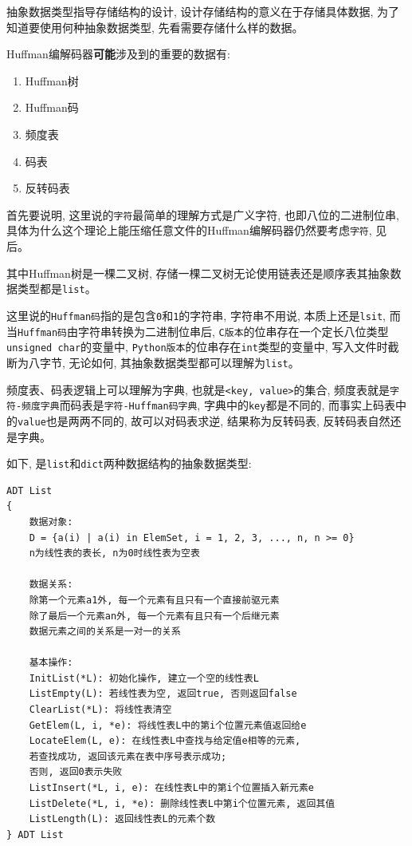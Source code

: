 \documentclass{ctexart}
\begin{document}
抽象数据类型指导存储结构的设计, 设计存储结构的意义在于存储具体数据, 为了知道要使用何种抽象数据类型, 先看需要存储什么样的数据。

Huffman编解码器\textbf{可能}涉及到的重要的数据有:

\begin{enumerate}
\def\labelenumi{\arabic{enumi}.}
\item
  Huffman树
\item
  Huffman码
\item
  频度表
\item
  码表
\item
  反转码表
\end{enumerate}

首先要说明, 这里说的\texttt{字符}最简单的理解方式是广义字符, 也即八位的二进制位串, 具体为什么这个理论上能压缩任意文件的Huffman编解码器仍然要考虑\texttt{字符}, 见后。

其中Huffman树是一棵二叉树, 存储一棵二叉树无论使用链表还是顺序表其抽象数据类型都是\texttt{list}。

这里说的\texttt{Huffman码}指的是包含\texttt{0}和\texttt{1}的字符串, 字符串不用说, 本质上还是\texttt{lsit},
而当\texttt{Huffman码}由字符串转换为二进制位串后, \texttt{C版本}的位串存在一个定长八位类型\texttt{unsigned\ char}的变量中, \texttt{Python版本}的位串存在\texttt{int}类型的变量中, 写入文件时截断为八字节, 无论如何, 其抽象数据类型都可以理解为\texttt{list}。

频度表、码表逻辑上可以理解为字典,
也就是\texttt{\textless{}key,\ value\textgreater{}}的集合, 频度表就是\texttt{字符-频度字典}而码表是\texttt{字符-Huffman码字典}, 字典中的\texttt{key}都是不同的, 而事实上码表中的\texttt{value}也是两两不同的, 故可以对码表求逆, 结果称为反转码表, 反转码表自然还是字典。

如下, 是\texttt{list}和\texttt{dict}两种数据结构的抽象数据类型:

\begin{verbatim}
ADT List
{
    数据对象:
    D = {a(i) | a(i) in ElemSet, i = 1, 2, 3, ..., n, n >= 0}
    n为线性表的表长, n为0时线性表为空表

    数据关系: 
    除第一个元素a1外, 每一个元素有且只有一个直接前驱元素
    除了最后一个元素an外, 每一个元素有且只有一个后继元素
    数据元素之间的关系是一对一的关系

    基本操作:
    InitList(*L): 初始化操作, 建立一个空的线性表L
    ListEmpty(L): 若线性表为空, 返回true, 否则返回false
    ClearList(*L): 将线性表清空
    GetElem(L, i, *e): 将线性表L中的第i个位置元素值返回给e
    LocateElem(L, e): 在线性表L中查找与给定值e相等的元素, 
    若查找成功, 返回该元素在表中序号表示成功; 
    否则, 返回0表示失败
    ListInsert(*L, i, e): 在线性表L中的第i个位置插入新元素e
    ListDelete(*L, i, *e): 删除线性表L中第i个位置元素, 返回其值
    ListLength(L): 返回线性表L的元素个数
} ADT List
\end{verbatim}
\end{document}
